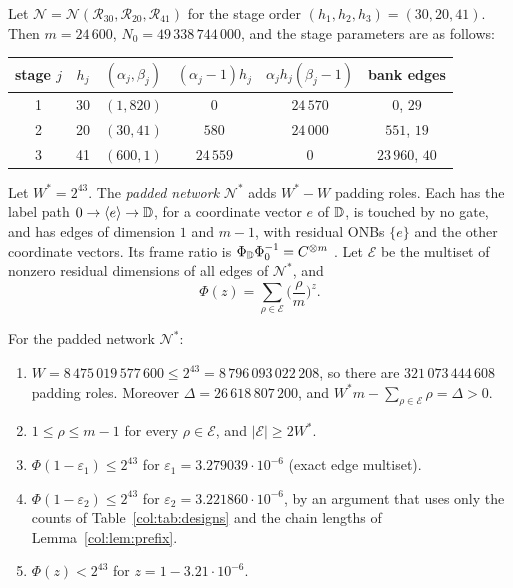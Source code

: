 Let $\mathcal N=\mathcal N(\mathcal R_{30},\mathcal R_{20},\mathcal R_{41})$ for the stage order $(h_1,h_2,h_3)=(30,20,41)$. Then
$m=24\,600$, $N_0=49\,338\,744\,000$, and the stage parameters are as follows:
\begin{center}\small
\begin{tabular}{@{}c c c c c c@{}}
\toprule
stage $j$ & $h_j$ & $(\alpha_j,\beta_j)$ & $(\alpha_j-1)h_j$ & $\alpha_jh_j(\beta_j-1)$ & bank edges\\
\midrule
1 & 30 & $(1,820)$ & $0$ & $24\,570$ & $0$, $29$\\
2 & 20 & $(30,41)$ & $580$ & $24\,000$ & $551$, $19$\\
3 & 41 & $(600,1)$ & $24\,559$ & $0$ & $23\,960$, $40$\\
\bottomrule
\end{tabular}
\end{center}
Let $W^*=2^{43}$. The \emph{padded network} $\mathcal N^*$ adds $W^*-W$ padding roles. Each has the label
path $0\to\langle e\rangle\to\mathbb{D}$, for a coordinate vector $e$ of $\mathbb{D}$, is touched by no gate, and
has edges of dimension $1$ and $m-1$, with residual ONBs $\{e\}$ and the other coordinate vectors. Its
frame ratio is $\Phi_{\mathbb{D}}\Phi_0^{-1}=C^{\otimes m}$ \cite[\S2.2]{oai}. Let $\mathcal E$ be the multiset of
nonzero residual dimensions of all edges of $\mathcal N^*$, and
\[
  \Phi(z)=\sum_{\rho\in\mathcal E}\Big(\frac{\rho}{m}\Big)^{z}.
\]

\begin{proposition}\label{col:prop:exponent}
For the padded network $\mathcal N^*$:
\begin{enumerate}
\item[(a)] $W=8\,475\,019\,577\,600\le 2^{43}=8\,796\,093\,022\,208$, so there are $321\,073\,444\,608$
  padding roles. Moreover $\Delta=26\,618\,807\,200$, and $W^*m-\sum_{\rho\in\mathcal E}\rho=\Delta>0$.
\item[(b)] $1\le\rho\le m-1$ for every $\rho\in\mathcal E$, and $|\mathcal E|\ge2W^*$.
\item[(c)] $\Phi(1-\varepsilon_1)\le2^{43}$ for $\varepsilon_1=3.279039\cdot10^{-6}$ (exact edge multiset).
\item[(d)] $\Phi(1-\varepsilon_2)\le2^{43}$ for $\varepsilon_2=3.221860\cdot10^{-6}$, by an argument that uses
  only the counts of Table~\ref{col:tab:designs} and the chain lengths of Lemma~\ref{col:lem:prefix}.
\item[(e)] $\Phi(z)<2^{43}$ for $z=1-3.21\cdot10^{-6}$.
\end{enumerate}
\end{proposition}

